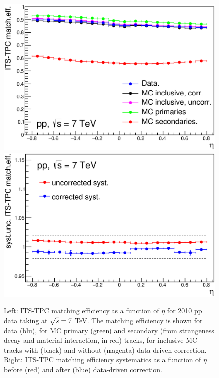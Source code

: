 \begin{figure}[!htb]
\begin{center}
\includegraphics[width=.49\textwidth]{FigCap4/ITSTPCmatchEff_10bpass4_vsEta.eps}
\includegraphics[width=.49\textwidth]{FigCap4/ITSTPCmatchEffSyst_10bpass4_vsEta.eps}
\caption{Left: ITS-TPC matching efficiency as a function of $\eta$ for 2010 pp data taking at $\sqrt{s} = 7$ TeV. The matching efficiency is shown for data (blu), for MC primary (green) and secondary (from strangeness decay and material interaction, in red) tracks, for inclusive MC tracks with (black) and without (magenta) data-driven correction. Right: ITS-TPC matching efficiency systematics as a function of $\eta$ before (red) and after (blue) data-driven correction.}
\label{fig:CorrMatchEffVsEta}
\end{center}
\end{figure}


